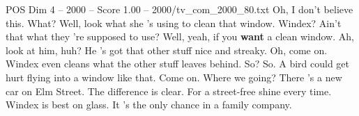 \begin{textsample}{POS Dim 4 – 2000 – Score 1.00 – 2000/tv\_com\_2000\_80.txt}  \label{ex:f4_pos_074}
Oh, I don't believe this.
What?
Well, look what she 's using to clean that window.
Windex?
Ain't that what they 're supposed to use?
Well, yeah, if you \textbf{want} a clean window.
Ah, look at him, huh?
He 's got that other stuff nice and streaky.
Oh, come on.
Windex even cleans what the other stuff leaves behind.
So?
So.
A bird could get hurt flying into a window like that.
Come on.
Where we going?
There 's a new car on Elm Street.
The difference is clear.
For a street-free shine every time.
Windex is best on glass.
It 's the only chance in a family company.

\end{textsample}
